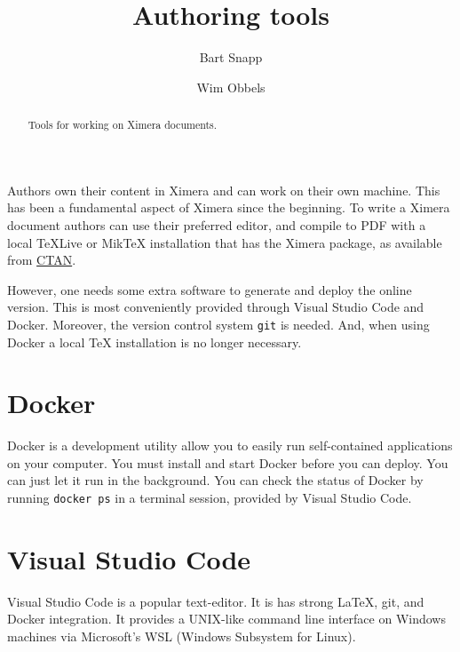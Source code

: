 \documentclass{ximera}
\title{Authoring tools}
\author{Bart Snapp \and Wim Obbels}
\begin{document}
\begin{abstract}
      Tools for working on Ximera documents.
\end{abstract}
\maketitle

Authors own their content in Ximera and can work on their own machine. This has
been a fundamental aspect of Ximera since the beginning. 
To write a Ximera document authors can use their preferred editor, and compile to PDF 
with a local TeXLive or MikTeX installation that has the Ximera package, 
as available from \href{https://ctan.org/pkg/ximera}{CTAN}.

However, one needs some extra software to generate and deploy the online version. 
This is most conveniently provided through Visual Studio Code and Docker.
Moreover, the version control system \verb!git! is needed.
And, when using Docker a local TeX installation is no longer necessary.


\section{Docker}

Docker is a development utility allow you to easily run self-contained applications on your
computer. You must install and start Docker before you can deploy. You can just let
it run in the background. You can check the status of Docker by running
\verb!docker ps! in a terminal session, provided by Visual Studio Code.

\section{Visual Studio Code}

Visual Studio Code
is a popular text-editor. It is has strong \LaTeX, git,
and Docker integration. It provides a UNIX-like command line interface on
Windows machines via Microsoft's WSL (Windows Subsystem for Linux).
\end{document}
